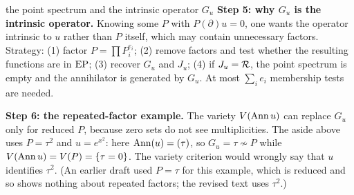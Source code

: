 \begin{explained}{the point spectrum and the intrinsic operator $G_u$}
\medskip\textbf{Step 5: why $G_u$ is the intrinsic operator.} Knowing some $P$ with $P(\partial)u=0$, one wants the operator intrinsic to $u$ rather than $P$ itself, which may contain unnecessary factors. Strategy: (1) factor $P=\prod P_i^{e_i}$; (2) remove factors and test whether the resulting functions are in $\mathrm{EP}$; (3) recover $G_u$ and $J_u$; (4) if $J_u=\mathcal{R}$, the point spectrum is empty and the annihilator is generated by $G_u$. At most $\sum_ie_i$ membership tests are needed.

\medskip\textbf{Step 6: the repeated-factor example.} The variety $V(\operatorname{Ann} u)$ can replace $G_u$ only for reduced $P$, because zero sets do not see multiplicities. The aside above uses $P=\tau^2$ and $u=e^{x^2}$: here $\operatorname{Ann}(u)=(\tau)$, so $G_u=\tau\not\sim P$ while $V(\operatorname{Ann} u)=V(P)=\{\tau=0\}$. The variety criterion would wrongly say that $u$ identifies $\tau^2$. (An earlier draft used $P=\tau$ for this example, which is reduced and so shows nothing about repeated factors; the revised text uses $\tau^2$.)
\end{explained}
